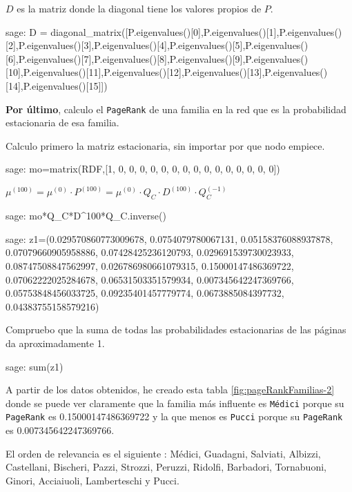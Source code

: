 \par $D$ es la matriz donde la diagonal tiene los valores propios de $P$.
\begin{sagecommandline}
    sage: D = diagonal_matrix([P.eigenvalues()[0],P.eigenvalues()[1],P.eigenvalues()[2],P.eigenvalues()[3],P.eigenvalues()[4],P.eigenvalues()[5],P.eigenvalues()[6],P.eigenvalues()[7],P.eigenvalues()[8],P.eigenvalues()[9],P.eigenvalues()[10],P.eigenvalues()[11],P.eigenvalues()[12],P.eigenvalues()[13],P.eigenvalues()[14],P.eigenvalues()[15]])
\end{sagecommandline}

\par \textbf{Por último}, calculo el \texttt{PageRank} de una familia en la red que es la probabilidad estacionaria de esa familia.
\par Calculo primero la matriz estacionaria, sin importar por que nodo empiece.
\begin{sagecommandline}
    sage: mo=matrix(RDF,[1, 0, 0, 0, 0, 0, 0, 0, 0, 0, 0, 0, 0, 0, 0, 0])
\end{sagecommandline}
\par $\mu^{(100)} = \mu^{(0)} \cdot P^{(100)} = \mu^{(0)} \cdot Q_C \cdot D^{(100)} \cdot Q_C^{(-1)}$
\begin{sagecommandline}
    sage: mo*Q_C*D^100*Q_C.inverse()
\end{sagecommandline}

\begin{sagecommandline}
    sage: z1=(0.029570860773009678, 0.0754079780067131, 0.05158376088937878, 0.07079660905958886, 0.07428425236120793, 0.029691539730023933, 0.08747508847562997, 0.026786980661079315, 0.15000147486369722, 0.07062222025284678, 0.06531503351579934, 0.007345642247369766, 0.05753848456033725, 0.09235401457779774, 0.0673885084397732, 0.04383755158579216)
\end{sagecommandline}

\par Compruebo que la suma de todas las probabilidades estacionarias de las páginas da aproximadamente 1.
\begin{sagecommandline}
    sage: sum(z1)
\end{sagecommandline}

\par A partir de los datos obtenidos, he creado esta tabla \ref{fig:pageRankFamilias-2} donde se puede ver claramente que 
la familia más influente es \texttt{Médici} porque su \texttt{PageRank} es 0.15000147486369722 y la que menos es 
\texttt{Pucci} porque su \texttt{PageRank} es 0.007345642247369766.
\par El orden de relevancia es el siguiente : Médici, Guadagni, Salviati, Albizzi, Castellani, Bischeri, Pazzi, Strozzi, Peruzzi,
Ridolfi, Barbadori, Tornabuoni, Ginori, Acciaiuoli, Lamberteschi y Pucci.

